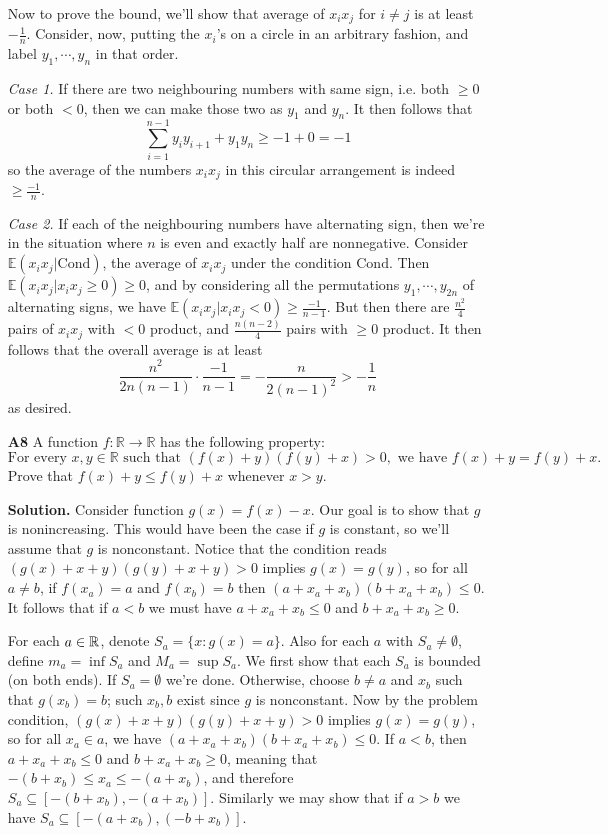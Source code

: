 \documentclass[11pt,a4paper]{article}
\begin{document}
\begin{enumerate}
	Now to prove the bound, we'll show that average of $x_ix_j$ for $i\neq j$ 
	is at least $-\frac{1}{n}$. 
	Consider, now, putting the $x_i$'s on a circle in an arbitrary fashion, 
	and label $y_1, \cdots, y_n$ in that order. 
	
	\emph{Case 1.} 
	If there are two neighbouring numbers with same sign, 
	i.e. both $\ge 0$ or both $<0$, 
	then we can make those two as $y_1$ and $y_n$. 
	It then follows that 
	\[
	\sum_{i=1}^{n-1}y_iy_{i+1}+y_1y_n\ge -1+0=-1
	\]
	so the average of the numbers $x_ix_j$ in this circular arrangement is indeed $\ge \frac{-1}{n}$. 
	
	\emph{Case 2.} 
	If each of the neighbouring numbers have alternating sign, 
	then we're in the situation where $n$ is even and exactly half are nonnegative. 
	Consider $\mathbb{E}(x_ix_j|\text{Cond})$, 
	the average of $x_ix_j$ under the condition $\text{Cond}$. 
	Then $\mathbb{E}(x_ix_j|x_ix_j\ge 0)\ge 0$, 
	and by considering all the permutations $y_1, \cdots, y_{2n}$ of alternating signs, 
	we have $\mathbb{E}(x_ix_j|x_ix_j< 0)\ge \frac{-1}{n-1}$. 
	But then there are $\frac{n^2}{4}$ pairs of $x_ix_j$ with $<0$ product, 
	and $\frac{n(n-2)}{4}$ pairs with $\ge 0$ product. 
	It then follows that the overall average is at least 
	\[
	\frac{n^2}{2n(n-1)}\cdot \frac{-1}{n-1}=-\frac{n}{2(n-1)^2} > -\frac{1}{n}
	\]
	as desired. 
	
	\item[\textbf{A8}]
	A function $f:\mathbb{R} \to \mathbb{R}$ has the following property:
	$$\text{For every } x,y \in \mathbb{R} \text{ such that }(f(x)+y)(f(y)+x) > 0, \text{ we have } f(x)+y = f(y)+x.$$Prove that $f(x)+y \leq f(y)+x$ whenever $x>y$.
	
	\textbf{Solution.} 
	Consider function $g(x) = f(x)-x$. Our goal is to show that $g$ is nonincreasing. 
	This would have been the case if $g$ is constant, so we'll assume that $g$ is nonconstant. 
	Notice that the condition reads $(g(x) + x + y)(g(y)+x+y) > 0$ implies $g(x)=g(y)$, 
	so for all $a\neq b$, if $f(x_a)=a$ and $f(x_b)=b$ then 
	$(a+x_a+x_b)(b+x_a+x_b)\le 0$. 
	It follows that if $a < b$ we must have $a+x_a+x_b\le 0$ and $b +x_a+x_b \ge 0$. 
	
	For each $a\in\mathbb{R}$, denote $S_a = \{x: g(x) = a\}$. 
	Also for each $a$ with $S_a\neq\emptyset$, define $m_a = \inf S_a$ and $M_a = \sup S_a$. 
	We first show that each $S_a$ is bounded (on both ends). 
	If $S_a=\emptyset$ we're done. 
	Otherwise, choose $b\neq a$ and $x_b$ such that $g(x_b)=b$; 
	such $x_b, b$ exist since $g$ is nonconstant. 
	Now by the problem condition, $(g(x)+x+y)(g(y)+x+y) > 0$ implies $g(x)=g(y)$, 
	so for all $x_a\in a$, we have $(a+x_a+x_b)(b+x_a+x_b)\le 0$. 
	If $a < b$, then $a+x_a+x_b\le 0$ and $b + x_a + x_b\ge 0$, 
	meaning that $-(b+x_b)\le x_a\le -(a+x_b)$, 
	and therefore $S_a\subseteq [-(b+x_b), -(a+x_b)]$. 
	Similarly we may show that if $a > b$ we have $S_a\subseteq [-(a+x_b), (-b+x_b)]$. 
	

\end{enumerate}
\end{document}
